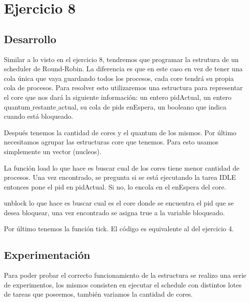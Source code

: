 \section{Ejercicio 8}


\subsection{Desarrollo}
Similar  a lo visto en el ejercicio 8, tendremos que programar la estrutura de un scheduler de Round-Robin. La diferencia es que en este caso en vez de tener una cola única que vaya guardando todos los procesos, cada core tendrá su propia cola de procesos. Para resolver esto utilizaremos una estructura para representar el core que nos dará la siguiente información: un entero pidActual, un entero quantum$\_$restante$\_$actual, su cola de pids enEspera, un booleano que indica cuando está bloqueado.

Después tenemos la cantidad de cores y el quantum de los mismos. Por último necesitamos agrupar las estructuras core que tenemos. Para esto usamos simplemente un vector (nucleos).

La función load lo que hace es buscar cual de los cores tiene menor cantidad de procesos. Una vez encontrado, se pregunta si se está ejecutando la tarea IDLE entonces pone el pid en pidActual. Si no, lo encola en el enEspera del core.

unblock lo que hace es buscar cual es el core donde se encuentra el pid que se desea bloquear, una vez encontrado se asigna true a la variable bloqueado.

Por último tenemos la función tick. El código es equivalente al del ejercicio 4.


\subsection{Experimentación}
Para poder probar el correcto funcionamiento de la estructura se realizo una serie de experimentos, los mismos consisten en ejecutar el schedule con distintos lotes de tareas que poseemos, también variamos la cantidad de cores.